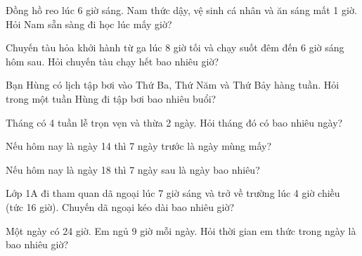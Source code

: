 \begin{ex}
Đồng hồ reo lúc 6 giờ sáng. Nam thức dậy, vệ sinh cá nhân và ăn sáng mất 1 giờ. Hỏi Nam sẵn sàng đi học lúc mấy giờ?
\end{ex}

\begin{ex}
Chuyến tàu hỏa khởi hành từ ga lúc 8 giờ tối và chạy suốt đêm đến 6 giờ sáng hôm sau. Hỏi chuyến tàu chạy hết bao nhiêu giờ?
\end{ex}

\begin{ex}
Bạn Hùng có lịch tập bơi vào Thứ Ba, Thứ Năm và Thứ Bảy hàng tuần. Hỏi trong một tuần Hùng đi tập bơi bao nhiêu buổi?
\end{ex}

\begin{ex}
Tháng có 4 tuần lễ trọn vẹn và thừa 2 ngày. Hỏi tháng đó có bao nhiêu ngày?
\end{ex}

\begin{ex}
Nếu hôm nay là ngày 14 thì 7 ngày trước là ngày mùng mấy?
\end{ex}

\begin{ex}
Nếu hôm nay là ngày 18 thì 7 ngày sau là ngày bao nhiêu?
\end{ex}

\begin{ex}
Lớp 1A đi tham quan dã ngoại lúc 7 giờ sáng và trở về trường lúc 4 giờ chiều (tức 16 giờ). Chuyến dã ngoại kéo dài bao nhiêu giờ?
\end{ex}

\begin{ex}
Một ngày có 24 giờ. Em ngủ 9 giờ mỗi ngày. Hỏi thời gian em thức trong ngày là bao nhiêu giờ?
\end{ex}

